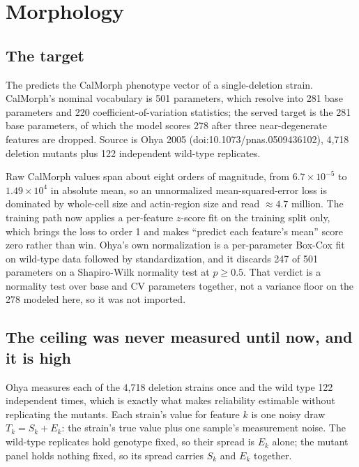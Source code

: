 
\section{Morphology}
\label{sec:morphology}

\subsection{The target}

The  predicts the CalMorph phenotype vector of a single-deletion
strain. CalMorph's nominal vocabulary is 501 parameters, which resolve into 281 base
parameters and 220 coefficient-of-variation statistics; the served target is the 281 base
parameters, of which the model scores 278 after three near-degenerate features are dropped.
Source is Ohya 2005 (doi:10.1073/pnas.0509436102), 4,718 deletion mutants plus 122
independent  wild-type replicates.

Raw CalMorph values span about eight orders of magnitude, from $6.7\times10^{-5}$ to
$1.49\times10^{4}$ in absolute mean, so an unnormalized mean-squared-error loss is
dominated by whole-cell size and actin-region size and read $\approx 4.7$ million. The
training path now applies a per-feature $z$-score fit on the training split only, which
brings the loss to order 1 and makes ``predict each feature's mean'' score zero rather than
win. Ohya's own normalization is a per-parameter Box-Cox fit on wild-type data followed by
standardization, and it discards 247 of 501 parameters on a Shapiro-Wilk normality test at
$p \ge 0.5$. That verdict is a normality test over base and CV parameters together, not a
variance floor on the 278 modeled here, so it was not imported.

\subsection{The ceiling was never measured until now, and it is high}

Ohya measures each of the 4,718 deletion strains once and the  wild type 122
independent times, which is exactly what makes reliability estimable without replicating the
mutants. Each strain's value for feature $k$ is one noisy draw $T_k = S_k + E_k$: the
strain's true value plus one sample's measurement noise. The wild-type replicates hold
genotype fixed, so their spread is $E_k$ alone; the mutant panel holds nothing fixed, so its
spread carries $S_k$ and $E_k$ together.

